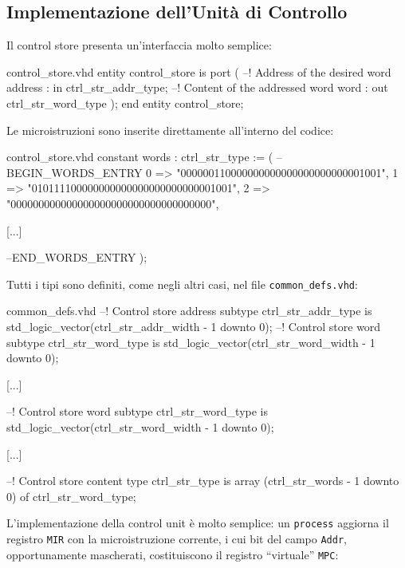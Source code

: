 \documentclass[a4paper,12pt]{scrreprt}
\begin{document}
\subsection{Implementazione dell'Unità di Controllo}

Il control store presenta un'interfaccia molto semplice:

\begin{myvhdl}{control\_store.vhd}
entity control_store is
  port (
    --! Address of the desired word
    address : in  ctrl_str_addr_type;
    --! Content of the addressed word
    word    : out ctrl_str_word_type
    );
end entity control_store;
\end{myvhdl}

Le microistruzioni sono inserite direttamente all'interno del codice:

\begin{myvhdl}{control\_store.vhd}
constant words : ctrl_str_type := (
--BEGIN_WORDS_ENTRY
0 => "000000110000000000000000000000001001",
1 => "010111100000000000000000000000001001",
2 => "000000000000000000000000000000000000",

[...]

--END_WORDS_ENTRY
);
\end{myvhdl}

Tutti i tipi sono definiti, come negli altri casi, nel file
\lstinline{common_defs.vhd}:

\begin{myvhdl}{common\_defs.vhd}
--! Control store address
subtype ctrl_str_addr_type is std_logic_vector(ctrl_str_addr_width - 1 downto 0);
--! Control store word
subtype ctrl_str_word_type is std_logic_vector(ctrl_str_word_width - 1 downto 0);

[...]

--! Control store word
subtype ctrl_str_word_type is std_logic_vector(ctrl_str_word_width - 1 downto 0);

[...]

--! Control store content
type ctrl_str_type is array (ctrl_str_words - 1 downto 0) of ctrl_str_word_type;
\end{myvhdl}

L'implementazione della control unit è molto semplice: un \lstinline{process}
aggiorna il registro \lstinline{MIR} con la microistruzione corrente, i cui bit
del campo \lstinline{Addr}, opportunamente mascherati, costituiscono il registro
``virtuale'' \lstinline{MPC}:
\end{document}
